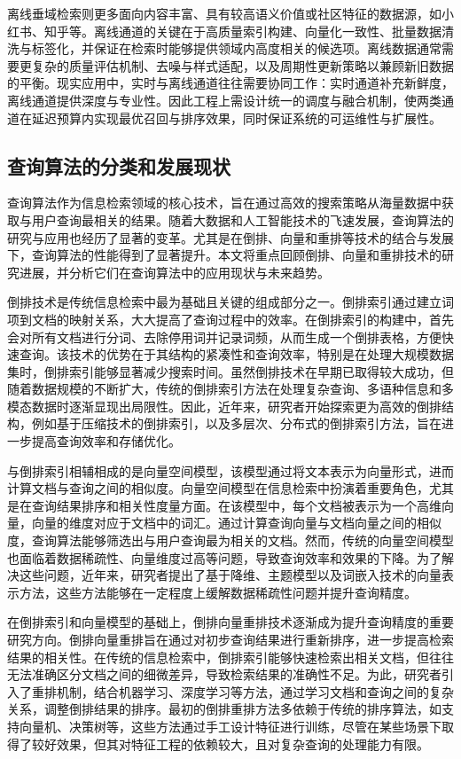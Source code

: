 离线垂域检索则更多面向内容丰富、具有较高语义价值或社区特征的数据源，如小红书、知乎等。离线通道的关键在于高质量索引构建、向量化一致性、批量数据清洗与标签化，并保证在检索时能够提供领域内高度相关的候选项\cite{sun2023offline}。离线数据通常需要更复杂的质量评估机制、去噪与样式适配，以及周期性更新策略以兼顾新旧数据的平衡\cite{wu2023periodic}。现实应用中，实时与离线通道往往需要协同工作：实时通道补充新鲜度，离线通道提供深度与专业性。因此工程上需设计统一的调度与融合机制，使两类通道在延迟预算内实现最优召回与排序效果\cite{yang2026routirfastservingretrieval}，同时保证系统的可运维性与扩展性。
\subsection{查询算法的分类和发展现状}

查询算法作为信息检索领域的核心技术，旨在通过高效的搜索策略从海量数据中获取与用户查询最相关的结果。随着大数据和人工智能技术的飞速发展，查询算法的研究与应用也经历了显著的变革。尤其是在倒排、向量和重排等技术的结合与发展下，查询算法的性能得到了显著提升。本文将重点回顾倒排、向量和重排技术的研究进展，并分析它们在查询算法中的应用现状与未来趋势。

倒排技术是传统信息检索中最为基础且关键的组成部分之一。倒排索引通过建立词项到文档的映射关系，大大提高了查询过程中的效率。在倒排索引的构建中，首先会对所有文档进行分词、去除停用词并记录词频，从而生成一个倒排表格，方便快速查询。该技术的优势在于其结构的紧凑性和查询效率，特别是在处理大规模数据集时，倒排索引能够显著减少搜索时间。虽然倒排技术在早期已取得较大成功，但随着数据规模的不断扩大，传统的倒排索引方法在处理复杂查询、多语种信息和多模态数据时逐渐显现出局限性。因此，近年来，研究者开始探索更为高效的倒排结构，例如基于压缩技术的倒排索引，以及多层次、分布式的倒排索引方法，旨在进一步提高查询效率和存储优化。

与倒排索引相辅相成的是向量空间模型，该模型通过将文本表示为向量形式，进而计算文档与查询之间的相似度。向量空间模型在信息检索中扮演着重要角色，尤其是在查询结果排序和相关性度量方面。在该模型中，每个文档被表示为一个高维向量，向量的维度对应于文档中的词汇。通过计算查询向量与文档向量之间的相似度，查询算法能够筛选出与用户查询最为相关的文档。然而，传统的向量空间模型也面临着数据稀疏性、向量维度过高等问题，导致查询效率和效果的下降。为了解决这些问题，近年来，研究者提出了基于降维、主题模型以及词嵌入技术的向量表示方法，这些方法能够在一定程度上缓解数据稀疏性问题并提升查询精度。

在倒排索引和向量模型的基础上，倒排向量重排技术逐渐成为提升查询精度的重要研究方向。倒排向量重排旨在通过对初步查询结果进行重新排序，进一步提高检索结果的相关性。在传统的信息检索中，倒排索引能够快速检索出相关文档，但往往无法准确区分文档之间的细微差异，导致检索结果的准确性不足。为此，研究者引入了重排机制，结合机器学习、深度学习等方法，通过学习文档和查询之间的复杂关系，调整倒排结果的排序。最初的倒排重排方法多依赖于传统的排序算法，如支持向量机、决策树等，这些方法通过手工设计特征进行训练，尽管在某些场景下取得了较好效果，但其对特征工程的依赖较大，且对复杂查询的处理能力有限。

